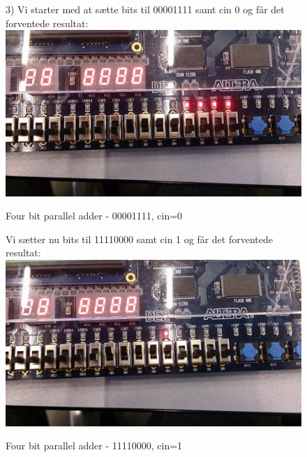 \begin{enumerate}
	\begin{figure}[H]
		\item[3)]
		Vi starter med at sætte bits til 00001111 samt cin 0 og får det forventede resultat:
		\centering
		\includegraphics[scale=0.5]{pictures/Oevelse3/00001111_cin0.jpg}
		\caption{Four bit parallel adder - 00001111, cin=0}
		\label{fig:4bitFa00001111cin0}
	\end{figure}

	\begin{figure}[H]
Vi sætter nu bits til 11110000 samt cin 1 og får det forventede resultat:
		\centering
		\includegraphics[scale=0.5]{pictures/Oevelse3/11110000_cin1.jpg}
		\caption{Four bit parallel adder - 11110000, cin=1}
		\label{fig:4bitFa11110000cin1}
	\end{figure}



\end{enumerate}
